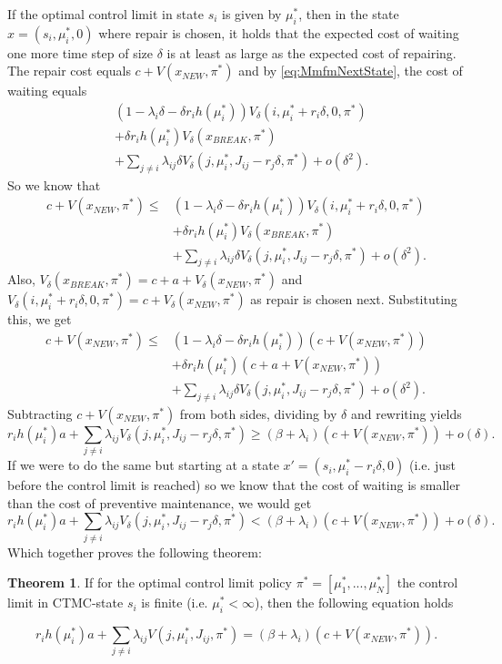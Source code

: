 \documentclass[a4paper]{thesis}
\theoremstyle{definition}
\newtheorem{theorem}{Theorem}[chapter]
\begin{document}
If the optimal control limit in state $s_i$ is given by $\mu_i^*$, then in the state $x=(s_i,\mu_i^*,0)$ where repair is chosen, it holds that the expected cost of waiting one more time step of size $\delta$ is at least as large as the expected cost of repairing.
The repair cost equals $c+V(x_{NEW},\pi^*)$ and by \eqref{eq:MmfmNextState}, the cost of waiting equals
\[
\begin{split}
&(1-\lambda_i \delta-\delta r_ih(\mu_i^*))V_\delta(i,\mu_i^*+r_i\delta,0,\pi^*)\\
&+ \delta r_ih(\mu_i^*)V_\delta(x_{BREAK},\pi^*)\\
&+\sum\limits_{j\neq i}\lambda_{ij} \delta V_\delta(j,\mu_i^*,J_{ij}-r_j\delta,\pi^*)+o(\delta^2).
\end{split}
\]
So we know that
\[
\begin{split}
c+V(x_{NEW},\pi^*)\leq 
&(1-\lambda_i \delta-\delta r_ih(\mu_i^*))V_\delta(i,\mu_i^*+r_i\delta,0,\pi^*)\\
&+ \delta r_ih(\mu_i^*)V_\delta(x_{BREAK},\pi^*)\\
&+\sum\limits_{j\neq i}\lambda_{ij} \delta V_\delta(j,\mu_i^*,J_{ij}-r_j\delta,\pi^*)+o(\delta^2).
\end{split}
\]
Also, $V_\delta(x_{BREAK},\pi^*)=c+a+V_\delta(x_{NEW},\pi^*)$ and $V_\delta(i,\mu_i^*+r_i\delta,0,\pi^*)=c+V_\delta(x_{NEW},\pi^*)$ as repair is chosen next.
Substituting this, we get
\[\begin{split}
c+V(x_{NEW},\pi^*)\leq
&(1-\lambda_i \delta-\delta r_ih(\mu_i^*))(c+V(x_{NEW},\pi^*))\\
&+ \delta r_ih(\mu_i^*)(c+a+V(x_{NEW},\pi^*))\\
&+\sum\limits_{j\neq i}\lambda_{ij} \delta V_\delta(j,\mu_i^*,J_{ij}-r_j\delta,\pi^*)+o(\delta^2).
\end{split}
\]
Subtracting $c+V(x_{NEW},\pi^*)$ from both sides, dividing by $\delta$ and rewriting yields
\[
r_ih(\mu_i^*)a+\sum\limits_{j\neq i}\lambda_{ij} V_\delta(j,\mu_i^*,J_{ij}-r_j\delta,\pi^*)\geq
(\beta+\lambda_i)(c+V(x_{NEW},\pi^*))+o(\delta).
\]
If we were to do the same but starting at a state $x'=(s_i,\mu_i^*-r_i\delta,0)$ (i.e. just before the control limit is reached) so we know that the cost of waiting is smaller than the cost of preventive maintenance, we would get
\[
r_ih(\mu_i^*)a+\sum\limits_{j\neq i}\lambda_{ij} V_\delta(j,\mu_i^*,J_{ij}-r_j\delta,\pi^*)<
(\beta+\lambda_i)(c+V(x_{NEW},\pi^*))+o(\delta).
\]
Which together proves the following theorem:
\begin{theorem}
	If for the optimal control limit policy $\pi^*=[\mu_1^*,...,\mu_N^*]$ the control limit in CTMC-state $s_i$ is finite (i.e. $\mu_i^*<\infty$), then the following equation holds 
	
	\begin{equation}\label{eq:MmfmHazardBounds}
	r_ih(\mu_i^*)a+\sum\limits_{j\neq i}\lambda_{ij} V(j,\mu_i^*,J_{ij},\pi^*)=
	(\beta+\lambda_i)(c+V(x_{NEW},\pi^*)).
	\end{equation}
\end{theorem}
\end{document}
